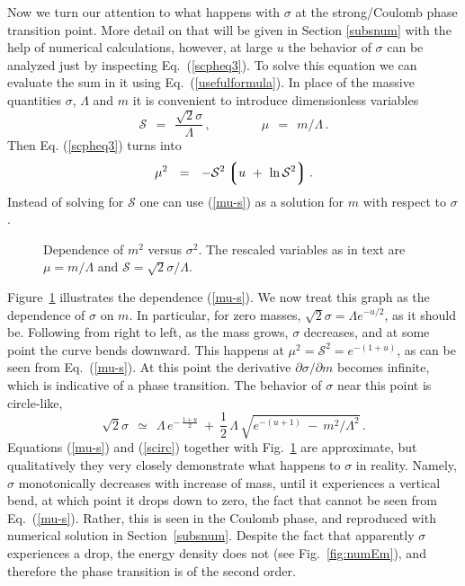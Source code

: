\documentclass[epsfig,12pt]{article}
\def\beq{\begin{equation}}
\def\eeq{\end{equation}}
\newcommand{\cs}{{\mathcal S}}
\def\beq{\begin{equation}}
\def\eeq{\end{equation}}
\newcommand{\p}{\partial}
\newcommand{\lgr}{\left\lgroup}
\newcommand{\rgr}{\right\rgroup}
\begin{document}
{%

Now we turn our attention to what happens with $\sigma $ at the strong/Coulomb
phase transition point.
More detail on that will be given in Section \ref{subsnum} with the help
of numerical calculations, however, at large $u$ the behavior of $\sigma$ can be analyzed 
just by inspecting Eq.~(\ref{scpheq3}). 
To solve this equation we can evaluate the sum in it using Eq.~(\ref{usefulformula}).
In place of the massive quantities $ \sigma $, $\Lambda $ and $ m $ it is convenient to 
introduce dimensionless variables
\beq
	\cs ~~=~~ \frac{\sqrt{2} \sigma}{\Lambda}\,, \qquad\qquad
        \mu ~~=~~ m/\Lambda\,.
\label{csdef}
\eeq
Then Eq. (\ref{scpheq3}) turns into
\beq
\label{mu-s}
	\mu^2  ~~=~~ - \cs^2 \lgr u  ~+~ \ln \cs^2 \rgr .
\eeq
Instead of solving for $ \cs $ one can use (\ref{mu-s}) as a solution for $ m $ with respect 
to $ \sigma $.
\begin{figure}
\centerline{\resizebox{11cm}{!}{}}
\caption{\small Dependence of $m^2$ versus $\sigma^2$. The rescaled variables as in text are
$\mu = m/\Lambda$ and $\cs = \sqrt{2}\sigma/\Lambda$. }
\label{fig:mus}
\end{figure}
Figure~\ref{fig:mus} illustrates the dependence (\ref{mu-s}). 
We now treat this graph as the dependence of $ \sigma $ on  $m$.
In particular, for zero masses, $ \sqrt{2}\sigma = \Lambda e^{-u/2} $, as it should be.
Following from right to left, as the mass grows, $ \sigma $ decreases, and at some point 
the curve bends downward. 
This happens at $ \mu^2 = \cs^2 = e^{-(1+u)}$, as can be seen from Eq.~(\ref{mu-s}). 
At this point the derivative $ \p\sigma/\p m $ becomes infinite, which is indicative of a
phase transition. 
The behavior of $ \sigma $ near this point is circle-like,
\beq
\label{scirc}
	\sqrt{2}\sigma ~~\simeq~~ \Lambda\, e^{-\, \frac{1+u}{2}}  ~+~ 
		\frac{1}{2}\,\Lambda\, \sqrt{e^{- (u+1)} ~-~ m^2/\Lambda^2 } \,.
\eeq
Equations (\ref{mu-s}) and  (\ref{scirc}) together with Fig.~\ref{fig:mus} are approximate, but qualitatively
they very closely demonstrate what happens to $ \sigma $ in reality. 
Namely, $ \sigma $ monotonically decreases with increase of mass, 
until it experiences a vertical bend, at which point
it drops down to zero, the fact that cannot be seen from Eq.~(\ref{mu-s}). 
Rather, this is seen in the Coulomb phase, and reproduced with numerical solution in Section~\ref{subsnum}.
Despite the fact that apparently $ \sigma $ experiences a drop, the energy density does not
(see Fig.~\ref{fig:numEm}), and therefore the phase transition is of the second order. 

}
\end{document}

